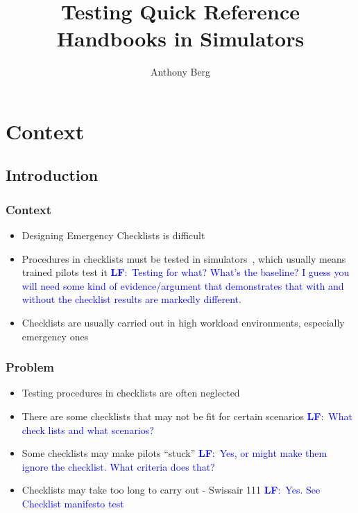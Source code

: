 \documentclass[a4paper]{article}
\author{Anthony Berg}
\title{Testing Quick Reference Handbooks in Simulators}
\newcommand{\lfcomment}[1]{\textcolor{blue}{\textbf{LF}:~#1}}
\begin{document}
\begin{titlepage}
    \clearpage\maketitle
    \thispagestyle{empty}
\end{titlepage}

\section{Context}
\subsection{Introduction}
\subsubsection*{Context}
\begin{itemize}
    \item Designing Emergency Checklists is difficult
    \item Procedures in checklists must be tested in simulators~\cite{nasa-design},
      which usually means trained pilots test it
      	\lfcomment{Testing for what? What's the baseline? I guess you will need some kind of evidence/argument that demonstrates that with and without the checklist results are markedly different. }
    \item Checklists are usually carried out in high
        workload environments, especially emergency ones
\end{itemize}

\subsubsection*{Problem}
\begin{itemize}
  \item Testing procedures in checklists are often neglected~\cite{nasa-design}
    \item There are some checklists that may not be fit
        for certain scenarios \lfcomment{What check lists and what scenarios?}
    \item Some checklists may make pilots \enquote{stuck}
    	\lfcomment{Yes, or might make them ignore the checklist. What criteria does that?}
    \item Checklists may take too long to carry out - Swissair 111
    	\lfcomment{Yes. See Checklist manifesto test}
\end{itemize}
\end{document}
